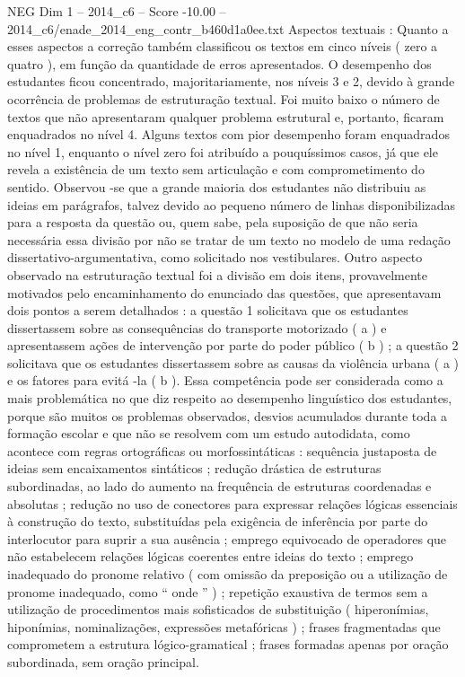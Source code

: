 \begin{textsample}{NEG Dim 1 – 2014\_c6 – Score -10.00 – 2014\_c6/enade\_2014\_eng\_contr\_b460d1a0ee.txt}
Aspectos textuais : Quanto a esses aspectos a correção também classificou os textos em cinco níveis ( zero a quatro ), em função da quantidade de erros apresentados.
O desempenho dos estudantes ficou concentrado, majoritariamente, nos níveis 3 e 2, devido à grande ocorrência de problemas de estruturação textual.
Foi muito baixo o número de textos que não apresentaram qualquer problema estrutural e, portanto, ficaram enquadrados no nível 4.
Alguns textos com pior desempenho foram enquadrados no nível 1, enquanto o nível zero foi atribuído a pouquíssimos casos, já que ele revela a existência de um texto sem articulação e com comprometimento do sentido.
Observou -se que a grande maioria dos estudantes não distribuiu as ideias em parágrafos, talvez devido ao pequeno número de linhas disponibilizadas para a resposta da questão ou, quem sabe, pela suposição de que não seria necessária essa divisão por não se tratar de um texto no modelo de uma redação dissertativo-argumentativa, como solicitado nos vestibulares.
Outro aspecto observado na estruturação textual foi a divisão em dois itens, provavelmente motivados pelo encaminhamento do enunciado das questões, que apresentavam dois pontos a serem detalhados : a questão 1 solicitava que os estudantes dissertassem sobre as consequências do transporte motorizado ( a ) e apresentassem ações de intervenção por parte do poder público ( b ) ; a questão 2 solicitava que os estudantes dissertassem sobre as causas da violência urbana ( a ) e os fatores para evitá -la ( b ).
Essa competência pode ser considerada como a mais problemática no que diz respeito ao desempenho linguístico dos estudantes, porque são muitos os problemas observados, desvios acumulados durante toda a formação escolar e que não se resolvem com um estudo autodidata, como acontece com regras ortográficas ou morfossintáticas : sequência justaposta de ideias sem encaixamentos sintáticos ; redução drástica de estruturas subordinadas, ao lado do aumento na frequência de estruturas coordenadas e absolutas ; redução no uso de conectores para expressar relações lógicas essenciais à construção do texto, substituídas pela exigência de inferência por parte do interlocutor para suprir a sua ausência ; emprego equivocado de operadores que não estabelecem relações lógicas coerentes entre ideias do texto ; emprego inadequado do pronome relativo ( com omissão da preposição ou a utilização de pronome inadequado, como “ onde ” ) ; repetição exaustiva de termos sem a utilização de procedimentos mais sofisticados de substituição ( hiperonímias, hiponímias, nominalizações, expressões metafóricas ) ; frases fragmentadas que comprometem a estrutura lógico-gramatical ; frases formadas apenas por oração subordinada, sem oração principal.

\end{textsample}
